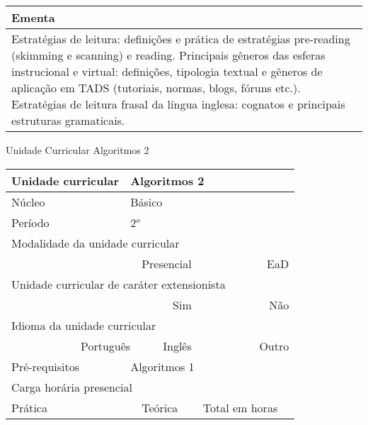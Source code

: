 \begin{quadro}[ht!]
\begin{tabular}{|p{3cm} p{2cm} p{3cm} p{2cm} p{3cm} p{2cm}|}
\multicolumn{6}{|p{15cm}|}{\cellcolor{blue1} Ementa} \\\hline
\hline\multicolumn{6}{|p{15cm}|}{\scriptsize Estratégias de leitura: definições e prática de estratégias pre-reading (skimming e scanning) e reading. Principais gêneros das esferas instrucional e virtual: definições, tipologia textual e gêneros de aplicação em TADS (tutoriais, normas, blogs, fóruns etc.). Estratégias de leitura frasal da língua inglesa: cognatos e principais estruturas gramaticais.}\\\hline
\hline
	\end{tabular}
\end{quadro}
\clearpage
\newpage\begin{quadro}[ht!]
  \centering\scriptsize
\caption{Unidade Curricular Algoritmos 2}
\label{ unit_6 }
\begin{tabular}{|p{3cm} p{2cm} p{3cm} p{2cm} p{3cm} p{2cm}|}\hline
\multicolumn{1}{|p{3cm}|}{\cellcolor{blue1} Unidade curricular} & \multicolumn{5}{p{9cm}|}{ Algoritmos 2 }\\\hline
\multicolumn{1}{|p{3cm}|}{\cellcolor{blue1} Núcleo} & \multicolumn{5}{p{11.5cm}|}{ Básico }\\\hline
\multicolumn{1}{|p{3cm}|}{\cellcolor{blue1} Período} & \multicolumn{5}{p{9cm}|}{ 2$^o$ }\\\hline
\multicolumn{6}{|p{15cm}|}{\cellcolor{blue1} Modalidade da unidade curricular} \\\hline
\multicolumn{2}{|r}{		} &  \multicolumn{2}{r}{Presencial \XBox } & \multicolumn{2}{r|}{EaD \Square	} \\\hline
\multicolumn{6}{|p{15cm}|}{\cellcolor{blue1} Unidade curricular de caráter extensionista} \\\hline
\multicolumn{4}{|r}{			Sim \Square	} & \multicolumn{2}{r|}{	Não \XBox	}\\\hline
\multicolumn{6}{|p{15cm}|}{\cellcolor{blue1} Idioma da unidade curricular} \\ \hline
\multicolumn{2}{|r}{	Português \XBox	} &  \multicolumn{2}{r}{	Inglês \Square	} & \multicolumn{2}{r|}{	Outro \Square	} \\ \hline
\multicolumn{1}{|p{3cm}|}{\cellcolor{blue1} Pré-requisitos} & \multicolumn{5}{p{9cm}|}{ Algoritmos 1 }\\ \hline
\multicolumn{6}{|p{15cm}|}{\cellcolor{blue1} Carga horária presencial} \\ \hline
\multicolumn{1}{|p{3cm}|}{\raggedleft Prática} & \multicolumn{1}{p{1cm}|}{\centering	30	} &  \multicolumn{1}{p{3cm}|}{\raggedleft Teórica}  & \multicolumn{1}{p{1cm}|}{\centering 	30 } & \multicolumn{1}{p{3cm}|}{\raggedleft Total em horas} & \multicolumn{1}{p{1cm}|}{\raggedleft	60	} \\ \hline

\end{tabular}
\end{quadro}
